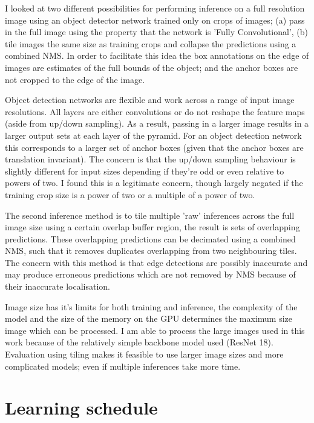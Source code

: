 I looked at two different possibilities for performing inference on a full resolution image using an object detector network trained only on crops of images; (a) pass in the full image using the property that the network is 'Fully Convolutional', (b) tile images the same size as training crops and collapse the predictions using a combined \gls{NMS}. In order to facilitate this idea the box annotations on the edge of images are estimates of the full bounds of the object; and the anchor boxes are not cropped to the edge of the image.

Object detection networks are flexible and work across a range of input image resolutions. All layers are either convolutions or do not reshape the feature maps (aside from up/down sampling). As a result, passing in a larger image results in a larger output sets at each layer of the pyramid. For an object detection network this corresponds to a larger set of anchor boxes (given that the anchor boxes are translation invariant). The concern is that the up/down sampling behaviour is slightly different for input sizes depending if they're odd or even relative to powers of two. I found this is a legitimate concern, though largely negated if the training crop size is a power of two or a multiple of a power of two. 

The second inference method is to tile multiple 'raw' inferences across the full image size using a certain overlap buffer region, the result is sets of overlapping predictions. These overlapping predictions can be decimated using a combined \gls{NMS}, such that it removes duplicates overlapping from two neighbouring tiles. The concern with this method is that edge detections are possibly inaccurate and may produce erroneous predictions which are not removed by \gls{NMS} because of their inaccurate localisation. 

Image size has it's limits for both training and inference, the complexity of the model and the size of the memory on the \gls{GPU} determines the maximum size image which can be processed. I am able to process the large images used in this work because of the relatively simple backbone model used (ResNet 18). Evaluation using tiling makes it feasible to use larger image sizes and more complicated models; even if multiple inferences take more time.


\section {Learning schedule}
\label{sec:schedule}

